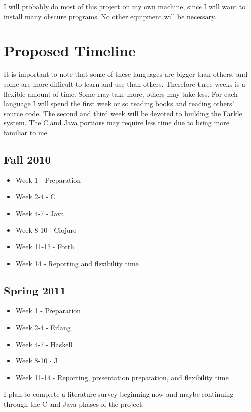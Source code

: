 \documentclass{article}
\begin{document}
I will probably do most of this project on my own machine, since I will want to
install many obscure programs.  No other equipment will be necessary.

\section{Proposed Timeline}

It is important to note that some of these languages are bigger than others, and
some are more difficult to learn and use than others.  Therefore three weeks is
a flexible amount of time.  Some may take more, others may take less.  For each
language I will spend the first week or so reading books and reading others'
source code.  The second and third week will be devoted to building the Farkle
system.  The C and Java portions may require less time due to being more
familiar to me.

\subsection{Fall 2010}
\begin{itemize}
\item Week 1 - Preparation
\item Week 2-4 - C
\item Week 4-7 - Java
\item Week 8-10 - Clojure
\item Week 11-13 - Forth
\item Week 14 - Reporting and flexibility time
\end{itemize}

\subsection{Spring 2011}
\begin{itemize}
\item Week 1 - Preparation
\item Week 2-4 - Erlang
\item Week 4-7 - Haskell\cite{SevenLang}
\item Week 8-10 - J
\item Week 11-14 - Reporting, presentation preparation, and flexibility time
\end{itemize}

I plan to complete a literature survey beginning now and maybe continuing
through the C and Java phases of the project.





\end{document}
